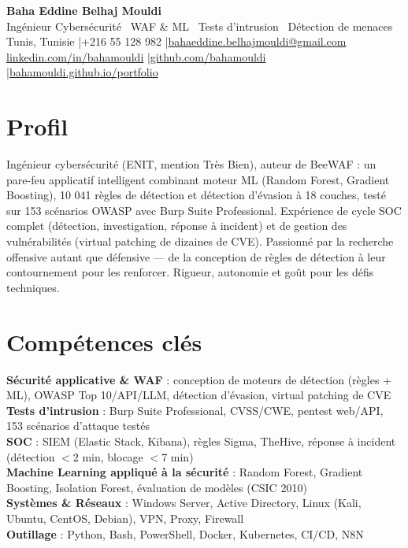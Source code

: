 \documentclass[a4paper,9pt]{article}
\begin{document}
\begin{center}
{\LARGE\bfseries\color{navy} Baha Eddine Belhaj Mouldi}\\[2pt]
{\normalsize\color{navy} Ingénieur Cybersécurité \textbar\ WAF \& ML \textbar\ Tests d'intrusion \textbar\ Détection de menaces}\\[3pt]
{\small Tunis, Tunisie \quad|\quad +216 55 128 982 \quad|\quad \href{mailto:bahaeddine.belhajmouldi@gmail.com}{bahaeddine.belhajmouldi@gmail.com}}\\[1pt]
{\small \href{https://www.linkedin.com/in/bahamouldi}{linkedin.com/in/bahamouldi} \quad|\quad \href{https://github.com/bahamouldi}{github.com/bahamouldi} \quad|\quad \href{https://bahamouldi.github.io/portfolio/}{bahamouldi.github.io/portfolio}}
\end{center}
\vspace{1pt}
\section{Profil}
Ingénieur cybersécurité (ENIT, mention Très Bien), auteur de BeeWAF : un pare-feu applicatif intelligent combinant moteur ML (Random Forest, Gradient Boosting), 10 041 règles de détection et détection d'évasion à 18 couches, testé sur 153 scénarios OWASP avec Burp Suite Professional. Expérience de cycle SOC complet (détection, investigation, réponse à incident) et de gestion des vulnérabilités (virtual patching de dizaines de CVE). Passionné par la recherche offensive autant que défensive --- de la conception de règles de détection à leur contournement pour les renforcer. Rigueur, autonomie et goût pour les défis techniques.
\section{Compétences clés}
\textbf{Sécurité applicative \& WAF} : conception de moteurs de détection (règles + ML), OWASP Top 10/API/LLM, détection d'évasion, virtual patching de CVE\\[0.3pt]
\textbf{Tests d'intrusion} : Burp Suite Professional, CVSS/CWE, pentest web/API, 153 scénarios d'attaque testés\\[0.3pt]
\textbf{SOC} : SIEM (Elastic Stack, Kibana), règles Sigma, TheHive, réponse à incident (détection $<$2 min, blocage $<$7 min)\\[0.3pt]
\textbf{Machine Learning appliqué à la sécurité} : Random Forest, Gradient Boosting, Isolation Forest, évaluation de modèles (CSIC 2010)\\[0.3pt]
\textbf{Systèmes \& Réseaux} : Windows Server, Active Directory, Linux (Kali, Ubuntu, CentOS, Debian), VPN, Proxy, Firewall\\[0.3pt]
\textbf{Outillage} : Python, Bash, PowerShell, Docker, Kubernetes, CI/CD, N8N
\end{document}
